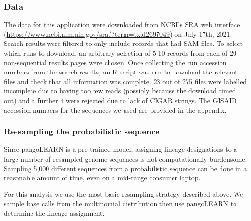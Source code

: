 \documentclass[10pt]{article}
\begin{document}
\subsubsection{Data}

The data for this application were downloaded from NCBI's SRA web interface (\url{https://www.ncbi.nlm.nih.gov/sra/?term=txid2697049}) on July 17th, 2021.
Search results were filtered to only include records that had SAM files.
To select which runs to download, an arbitrary selection of 5-10 records from each of 20 non-sequential results pages were chosen.
Once collecting the run accession numbers from the search results, an R script was run to download the relevant files and check that all information was complete.
23 out of 275 files were labelled incomplete due to having too few reads (possibly because the download timed out) and a further 4 were rejected due to lack of CIGAR strings.
The GISAID accession numbers for the sequences we used are provided in the appendix. 


\subsubsection{Re-sampling the probabilistic sequence}


Since pangoLEARN is a pre-trained model, assigning lineage designations to a large number of resampled genome sequences is not computationally burdensome.
Sampling 5,000 different sequences from a probabilistic sequence can be done in a reasonable amount of time, even on a mid-range consumer laptop.

For this analysis we use the most basic resampling strategy described above.
We sample base calls from the multinomial distribution then use pangoLEARN to determine the lineage assignment.
\end{document}
